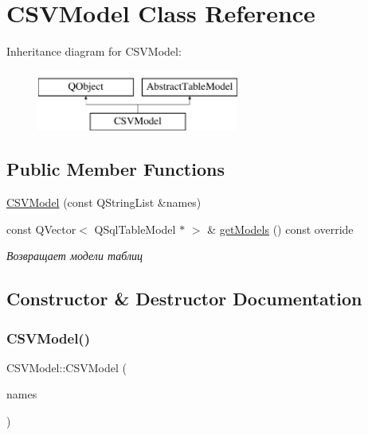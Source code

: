 \hypertarget{class_c_s_v_model}{}\section{C\+S\+V\+Model Class Reference}
\label{class_c_s_v_model}
Inheritance diagram for C\+S\+V\+Model\+:\begin{figure}[H]
\begin{center}
\leavevmode
\includegraphics[height=2.000000cm]{class_c_s_v_model}
\end{center}
\end{figure}
\subsection*{Public Member Functions}
\begin{DoxyCompactItemize}
\item 
\mbox{\hyperlink{class_c_s_v_model_ab0d54143ff743aae7918d779301ab0e8}{C\+S\+V\+Model}} (const Q\+String\+List \&names)
\item 
const Q\+Vector$<$ Q\+Sql\+Table\+Model $\ast$ $>$ \& \mbox{\hyperlink{class_c_s_v_model_adf61a056aa4dcb63471cb982a6f24e46}{get\+Models}} () const override
\begin{DoxyCompactList}\small\item\em Возвращает модели таблиц \end{DoxyCompactList}\end{DoxyCompactItemize}


\subsection{Constructor \& Destructor Documentation}
\mbox{\label{class_c_s_v_model_ab0d54143ff743aae7918d779301ab0e8}} 
\subsubsection{\texorpdfstring{C\+S\+V\+Model()}{CSVModel()}}
{\footnotesize\ttfamily C\+S\+V\+Model\+::\+C\+S\+V\+Model (\begin{DoxyParamCaption}\item[{const Q\+String\+List \&}]{names }\end{DoxyParamCaption})}


